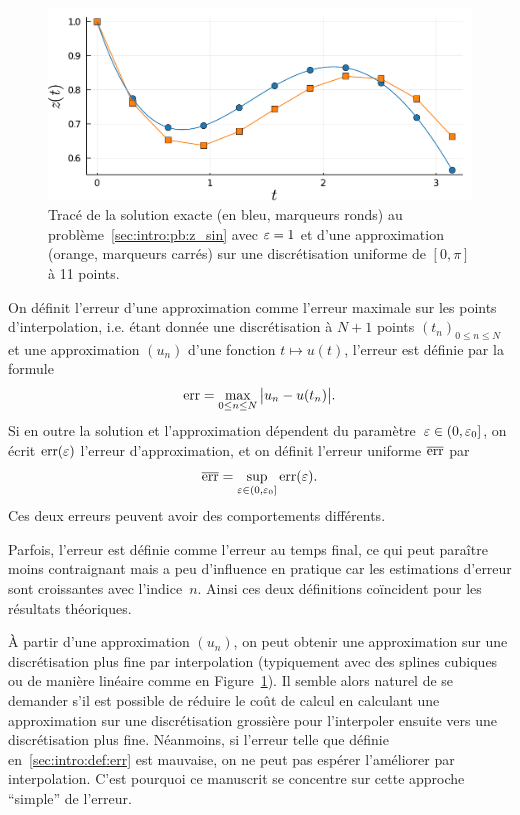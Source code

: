 \begin{figure}[!ht]
    \centering
    \includegraphics[width=.9\textwidth]{./Presentation/approx_sin.pdf}
    \caption{Tracé de la solution exacte (en bleu, marqueurs ronds) au problème~\eqref{sec:intro:pb:z_sin} avec $\varepsilon = 1$ et d'une approximation (orange, marqueurs carrés) sur une discrétisation uniforme de $[0,\pi]$ à 11 points.}
    \label{sec:intro:fig:approx_sin}
\end{figure}


\begin{FRdefinition*}
    On définit l'erreur d'une approximation comme l'erreur maximale sur les points d'interpolation, i.e. étant donnée une discrétisation à $N+1$ points $(t_n)_{0 \leq n \leq N}$ et une approximation $(u_n)$ d'une fonction $t \mapsto u(t)$, l'erreur est définie par la formule 
    \begin{equation} \label{sec:intro:def:err}
        \operatorname{err} = \max_{0 \leq n \leq N}\big| u_n - u(t_n) \big| .
    \end{equation}
    Si en outre la solution et l'approximation dépendent du paramètre~$\varepsilon \in (0,\varepsilon_0]$, on écrit $\operatorname{err}(\varepsilon)$ l'erreur d'approximation, et on définit l'erreur uniforme $\overline{\operatorname{err}}$ par 
    \begin{equation}
        \overline{\operatorname{err}} = \sup_{\varepsilon \in (0,\varepsilon_0]} \operatorname{err}(\varepsilon) .
    \end{equation}
    Ces deux erreurs peuvent avoir des comportements différents.
\end{FRdefinition*}
Parfois, l'erreur est définie comme l'erreur au temps final, ce qui peut paraître moins contraignant mais a peu d'influence en pratique car les estimations d'erreur sont croissantes avec l'indice~$n$. Ainsi ces deux définitions coïncident pour les résultats théoriques.

\begin{FRremark*}
    À partir d'une approximation $(u_n)$, on peut obtenir une approximation sur une discrétisation plus fine par interpolation (typiquement avec des splines cubiques ou de manière linéaire comme en Figure~\ref{sec:intro:fig:approx_sin}). Il semble alors naturel de se demander s'il est possible de réduire le coût de calcul en calculant une approximation sur une discrétisation grossière pour l'interpoler ensuite vers une discrétisation plus fine. Néanmoins, si l'erreur telle que définie en~\eqref{sec:intro:def:err} est mauvaise, on ne peut pas espérer l'améliorer par interpolation. C'est pourquoi ce manuscrit se concentre sur cette approche \enquote{simple} de l'erreur.
\end{FRremark*}

